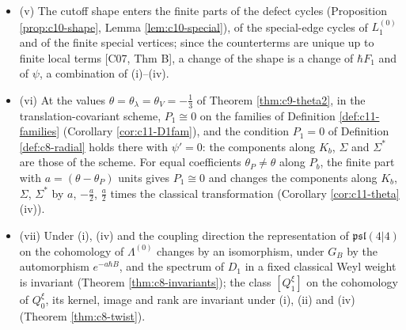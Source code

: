 \begin{proposition}
\begin{itemize}
\item (v) The cutoff shape enters the finite parts of the defect cycles (Proposition \ref{prop:c10-shape}, Lemma \ref{lem:c10-special}), of the special-edge cycles of $L_1^{(0)}$ and of the finite special vertices; since the counterterms are unique up to finite local terms [C07, Thm B], a change of the shape is a change of $\hbar F_1$ and of $\psi$, a combination of (i)--(iv).
\item (vi) At the values $\theta=\theta_\lambda=\theta_V=-\tfrac13$ of Theorem \ref{thm:c9-theta2}, in the translation-covariant scheme, $P_1\cong0$ on the families of Definition \ref{def:c11-families} (Corollary \ref{cor:c11-D1fam}), and the condition $P_1=0$ of Definition \ref{def:c8-radial} holds there with $\psi'=0$: the components along $K_b$, $\Sigma$ and $\Sigma^*$ are those of the scheme. For equal coefficients $\theta_P\ne\theta$ along $P_b$, the finite part with $a=(\theta-\theta_P)$ units gives $P_1\cong0$ and changes the components along $K_b$, $\Sigma$, $\Sigma^*$ by $a$, $-\tfrac a2$, $\tfrac a2$ times the classical transformation (Corollary \ref{cor:c11-theta} (iv)).
\item (vii) Under (i), (iv) and the coupling direction the representation of $\mathfrak{psl}(4|4)$ on the cohomology of $\Lambda^{(0)}$ changes by an isomorphism, under $G_B$ by the automorphism $e^{-a\hbar B}$, and the spectrum of $D_1$ in a fixed classical Weyl weight is invariant (Theorem \ref{thm:c8-invariants}); the class $[Q^\xi_1]$ on the cohomology of $Q^\xi_0$, its kernel, image and rank are invariant under (i), (ii) and (iv) (Theorem \ref{thm:c8-twist}).
\end{itemize}
\end{proposition}
